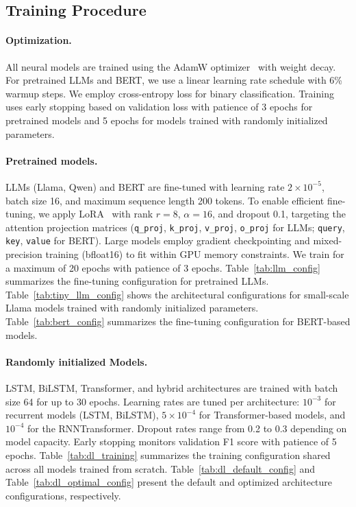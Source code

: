 \documentclass{article} %
\theoremstyle{plain}
\theoremstyle{definition}
\theoremstyle{remark}
\begin{document}
\subsection{Training Procedure}
\label{subsec:training_appendix}

\paragraph{Optimization.}
All neural models are trained using the AdamW optimizer~\citep{AdamW} with weight decay. For pretrained LLMs and BERT, we use a linear learning rate schedule with 6\% warmup steps. We employ cross-entropy loss for binary classification. Training uses early stopping based on validation loss with patience of 3 epochs for pretrained models and 5 epochs for models trained with randomly initialized parameters.

\paragraph{Pretrained models.}
LLMs (Llama, Qwen) and BERT are fine-tuned with learning rate $2 \times 10^{-5}$, batch size 16, and maximum sequence length 200 tokens. To enable efficient fine-tuning, we apply LoRA~\citep{LoRA} with rank $r=8$, $\alpha=16$, and dropout 0.1, targeting the attention projection matrices (\texttt{q\_proj}, \texttt{k\_proj}, \texttt{v\_proj}, \texttt{o\_proj} for LLMs; \texttt{query}, \texttt{key}, \texttt{value} for BERT). Large models employ gradient checkpointing and mixed-precision training (bfloat16) to fit within GPU memory constraints. We train for a maximum of 20 epochs with patience of 3 epochs. Table~\ref{tab:llm_config} summarizes the fine-tuning configuration for pretrained LLMs. Table~\ref{tab:tiny_llm_config} shows the architectural configurations for small-scale Llama models trained with randomly initialized parameters. Table~\ref{tab:bert_config} summarizes the fine-tuning configuration for BERT-based models.

\paragraph{Randomly initialized Models.}
LSTM, BiLSTM, Transformer, and hybrid architectures are trained with batch size 64 for up to 30 epochs. Learning rates are tuned per architecture: $10^{-3}$ for recurrent models (LSTM, BiLSTM), $5 \times 10^{-4}$ for Transformer-based models, and $10^{-4}$ for the RNNTransformer. Dropout rates range from 0.2 to 0.3 depending on model capacity. Early stopping monitors validation F1 score with patience of 5 epochs. Table~\ref{tab:dl_training} summarizes the training configuration shared across all models trained from scratch. Table~\ref{tab:dl_default_config} and Table~\ref{tab:dl_optimal_config} present the default and optimized architecture configurations, respectively.
\end{document}
